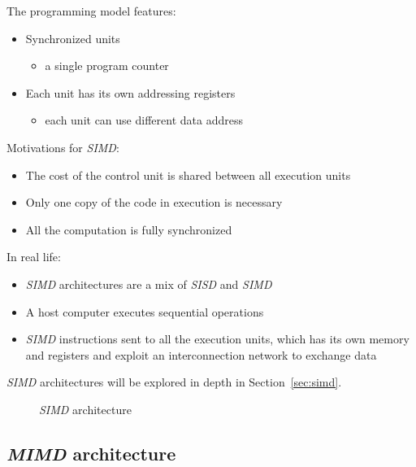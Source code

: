 \documentclass[english]{article}
\begin{document}
The programming model features:

\begin{itemize}
  \item Synchronized units
        \begin{itemize}
          \item a single program counter
        \end{itemize}
  \item Each unit has its own addressing registers
        \begin{itemize}
          \item each unit can use different data address
        \end{itemize}
\end{itemize}

Motivations for \textit{SIMD}:

\begin{itemize}
  \item The cost of the control unit is shared between all execution units
  \item Only one copy of the code in execution is necessary
  \item All the computation is fully synchronized
\end{itemize}

In real life:

\begin{itemize}
  \item \textit{SIMD} architectures are a mix of \textit{SISD} and \textit{SIMD}
  \item A host computer executes sequential operations
  \item \textit{SIMD} instructions sent to all the execution units, which has its own memory and registers and exploit an interconnection network to exchange data
\end{itemize}

\bigskip
\textit{SIMD} architectures will be explored in depth in Section~\ref{sec:simd}.

\begin{figure}[htbp]
  \bigskip
  \centering
  \caption{\textit{SIMD} architecture}
  \label{fig:simd-architecture}
  \bigskip
\end{figure}

\subsection{\textit{MIMD} architecture}
\end{document}
